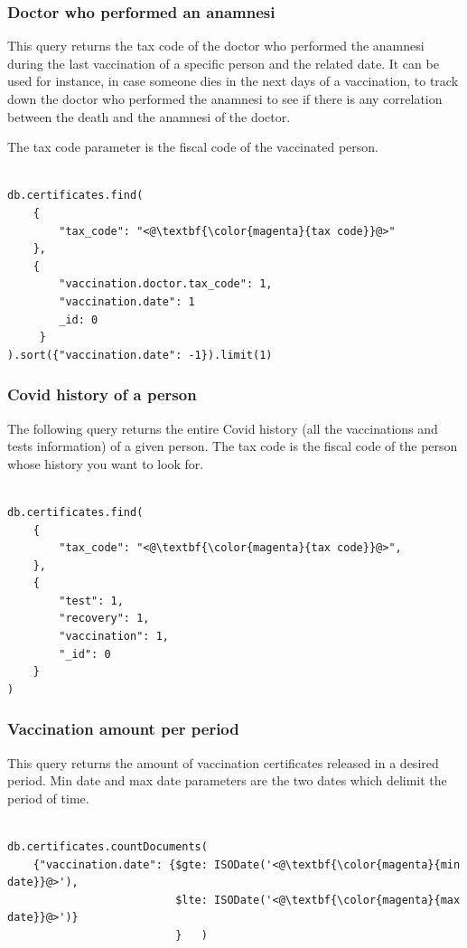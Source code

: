 \documentclass{article}
\begin{document}
\subsubsection{Doctor who performed an anamnesi}
This query returns the tax code of the doctor who performed the anamnesi during the last vaccination of a specific person and the related date.
It can be used for instance, in case someone dies in the next days of a vaccination, to track down the doctor who performed the anamnesi to see if there is any correlation between the death and the anamnesi of the doctor.

The tax code parameter is the fiscal code of the vaccinated person.

\begin{lstlisting}[language=cypher, label=lst:cypher-example]

db.certificates.find(
    {
        "tax_code": "<@\textbf{\color{magenta}{tax code}}@>"
    },
    {
        "vaccination.doctor.tax_code": 1,
        "vaccination.date": 1
        _id: 0
     }
).sort({"vaccination.date": -1}).limit(1)

\end{lstlisting}
\subsubsection{Covid history of a person}
The following query returns the entire Covid history (all the vaccinations and tests information) of a given person.
The tax code is the fiscal code of the person whose history you want to look for.

\begin{lstlisting}[language=cypher, label=lst:cypher-example]

db.certificates.find(
    {
        "tax_code": "<@\textbf{\color{magenta}{tax code}}@>",
    },
    {
        "test": 1,
        "recovery": 1,
        "vaccination": 1,
        "_id": 0
    }
)

\end{lstlisting}
\subsubsection{Vaccination amount per period}
This query returns the amount of vaccination certificates released in a desired period. Min date and max date parameters are the two dates which delimit the period of time.

\begin{lstlisting}[language=cypher, label=lst:cypher-example]

db.certificates.countDocuments(
    {"vaccination.date": {$gte: ISODate('<@\textbf{\color{magenta}{min date}}@>'),
                          $lte: ISODate('<@\textbf{\color{magenta}{max date}}@>')}
                          }   )


\end{lstlisting}
\newpage
\end{document}
